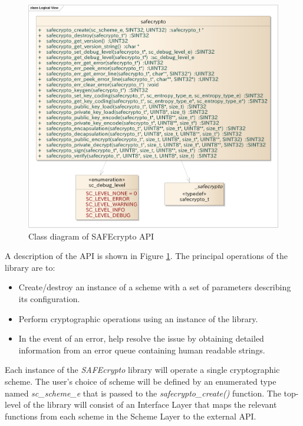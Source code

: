 \begin{figure}[!h]
\centering
\includegraphics[width=14cm]{libsafecrypto_logical_view.png}
\caption{Class diagram of SAFEcrypto API}
\label{fig:safecrypto_api}
\end{figure}

\newpage
A description of the API is shown in Figure \ref{fig:safecrypto_api}. The principal operations of the library are to:

\begin{itemize}
\item Create/destroy an instance of a scheme with a set of parameters describing its configuration.
\item Perform cryptographic operations using an instance of the library.
\item In the event of an error, help resolve the issue by obtaining detailed information from an error queue containing human readable strings.
\end{itemize}

Each instance of the \textit{SAFEcrypto} library will operate a single cryptographic scheme. The user's choice of scheme will be defined by an enumerated type named \textit{sc\_scheme\_e} that is passed to the \textit{safecrypto\_create()} function. The top-level of the library will consist of an Interface Layer that maps the relevant functions from each scheme in the Scheme Layer to the external API.

